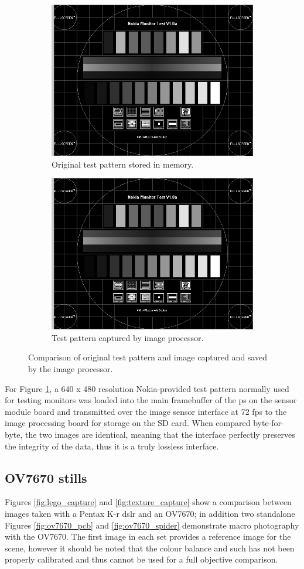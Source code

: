 \begin{figure}
\centering
\begin{subfigure}{.5\textwidth}
  \centering
  \includegraphics[width=.4\linewidth]{./img/ov7670_test_pattern_capture.png}
  \caption{Original test pattern stored in memory.}
\end{subfigure}%
\begin{subfigure}{.5\textwidth}
  \centering
  \includegraphics[width=.4\linewidth]{./img/ov7670_test_pattern_capture.png}
  \caption{Test pattern captured by image processor.}
\end{subfigure}
\caption{Comparison of original test pattern and image captured and saved by the image processor.}
\label{fig:test_pattern_capture}
\end{figure}

For Figure \ref{fig:test_pattern_capture}, a 640 x 480 resolution Nokia-provided test pattern normally used for testing monitors was loaded into the main framebuffer of the \gls{ps} on the sensor module board and transmitted over the image sensor interface at 72 \gls{fps} to the image processing board for storage on the SD card. When compared byte-for-byte, the two images are identical, meaning that the interface perfectly preserves the integrity of the data, thus it is a truly lossless interface.

\subsection{OV7670 stills}

Figures \ref{fig:lego_capture} and \ref{fig:texture_capture} show a comparison between images taken with a Pentax K-r \gls{dslr} and an OV7670; in addition two standalone Figures \ref{fig:ov7670_pcb} and \ref{fig:ov7670_spider} demonstrate macro photography with the OV7670. The first image in each set provides a reference image for the scene, however it should be noted that the colour balance and such has not been properly calibrated and thus cannot be used for a full objective comparison.

